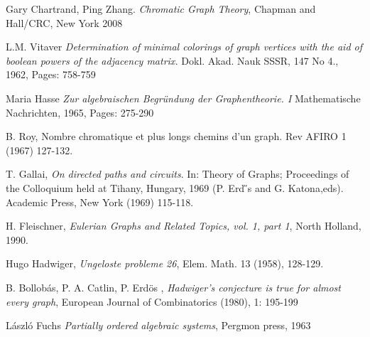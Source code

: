 {\begin{thebibliography}{9}
 Gary Chartrand, Ping Zhang. \textit{Chromatic Graph Theory}, Chapman and Hall/CRC, New York 2008

 L.M. Vitaver \textit{Determination of minimal colorings of graph vertices with the aid of boolean powers of the adjacency matrix.} Dokl. Akad. Nauk SSSR, 147 No 4., 1962, Pages: 758-759

 Maria Hasse \textit{Zur algebraischen Begr\"undung der Graphentheorie. I} Mathematische Nachrichten, 1965, Pages: 275-290

B. Roy, Nombre chromatique et plus longs chemins d'un graph. Rev AFIRO
1 (1967) 127-132.

\newpage

T. Gallai, \textit{On directed paths and circuits}. In: Theory of Graphs; Proceedings of the Colloquium held at Tihany, Hungary, 1969 (P. Erd ̋s and G. Katona,eds). Academic Press, New York (1969) 115-118.

 H. Fleischner, \textit{Eulerian Graphs and Related Topics, vol. 1, part 1}, North Holland, 1990.

 Hugo Hadwiger, \textit{Ungeloste probleme 26}, Elem. Math. 13 (1958), 128-129.

 B. Bollobás, P. A. Catlin, P.  Erd\"os , \textit{Hadwiger's conjecture is true for almost every graph}, European Journal of Combinatorics (1980), 1: 195-199

  L\'aszl\'o Fuchs \textit{Partially ordered algebraic systems}, Pergmon press, 1963

\end{thebibliography}
}